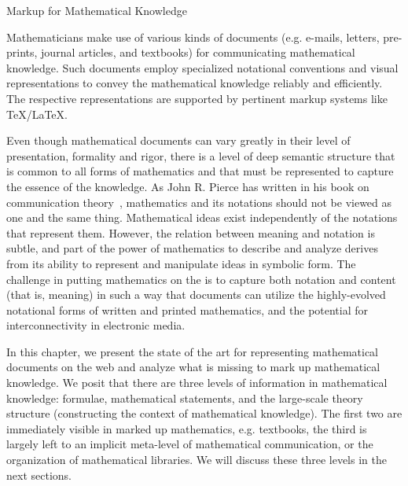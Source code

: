 
\begin{tchapter}[id=math-markup]{Markup for Mathematical Knowledge}

  Mathematicians make use of various kinds of documents (e.g. e-mails, letters,
  pre-prints, journal articles, and textbooks) for communicating mathematical
  knowledge. Such documents employ specialized notational conventions and visual
  representations to convey the mathematical knowledge reliably and efficiently.  The
  respective representations are supported by pertinent   markup systems like
  {\TeX/\LaTeX}.

  Even though mathematical documents can vary greatly in their level of presentation,
  formality and rigor, there is a level of deep semantic structure that is common to all
  forms of mathematics and that must be represented to capture the essence of the
  knowledge. As John R. Pierce has written in his book on communication
  theory~\cite{Pierce:aitit80}, mathematics and its notations should not be viewed as one
  and the same thing. Mathematical ideas exist independently of the notations that
  represent them. However, the relation between meaning and notation is subtle, and part
  of the power of mathematics to describe and analyze derives from its ability to
  represent and manipulate ideas in symbolic form. The challenge in putting mathematics on
  the {} is to capture both notation and content (that is,
  meaning) in such a way that documents can utilize the highly-evolved notational forms of
  written and printed mathematics, and the potential for interconnectivity in electronic
  media.

  In this chapter, we present the state of the art for representing mathematical documents
  on the web and analyze what is missing to mark up mathematical knowledge.  We posit that
  there are three levels of information in mathematical knowledge: formulae, mathematical
  statements, and the large-scale theory structure (constructing the context of
  mathematical knowledge). The first two are immediately visible in marked up mathematics,
  e.g.  textbooks, the third is largely left to an implicit meta-level of mathematical
  communication, or the organization of mathematical libraries. We will discuss these
  three levels in the next sections.


\end{tchapter}
